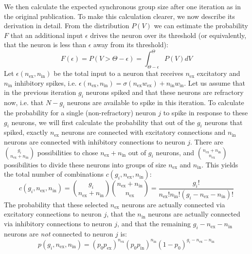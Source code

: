 \documentclass[10pt,a4paper,onecolumn]{article}
\begin{document}
We then calculate the expected synchronous group size after one iteration as in the original publication. To make this calculation clearer, we now describe its derivation in detail. From the distribution $P(V)$ we can estimate the probability $F$ that an additional input $\epsilon$ drives the neuron over its threshold (or equivalently, that the neuron is less than $\epsilon$ away from its threshold):
\begin{equation}
F(\epsilon) = P(V>\Theta-\epsilon) = \int_{\Theta-\epsilon}^{\Theta}P(V)dV
\end{equation}
Let $\epsilon(n_\text{ex}, n_\text{in})$ be the total input to a neuron that receives $n_\text{ex}$ excitatory and $n_\text{in}$ inhibitory spikes, i.e. $\epsilon(n_\text{ex}, n_\text{in}) = \sigma(n_\text{ex}w_\text{ex}) + n_\text{in}w_\text{in}$. Let us assume that in the previous iteration $g_i$ neurons spiked and that these neurons are refractory now, i.e. that $N-g_i$ neurons are available to spike in this iteration. To calculate the probability for a single (non-refractory) neuron $j$ to spike in response to these $g_i$ neurons, we will first calculate the probability that out of the $g_i$ neurons that spiked, exactly $n_\text{ex}$ neurons are connected with excitatory connections and $n_\text{in}$ neurons are connected with inhibitory connections to neuron $j$. There are $\binom{g_i}{n_\text{ex} + n_\text{in}}$ possibilities to chose $n_\text{ex} + n_\text{in}$ out of $g_i$ neurons, and $\binom{n_\text{ex} + n_\text{in}}{n_\text{ex}}$ possibilities to divide these neurons into groups of size $n_\text{ex}$ and $n_\text{in}$. This yields the total number of combinations $c(g_i, n_\text{ex}, n_\text{in})$:
\begin{equation}
c(g_i, n_\text{ex}, n_\text{in}) = \binom{g_i}{n_\text{ex} + n_\text{in}}\binom{n_\text{ex} + n_\text{in}}{n_\text{ex}} = \frac{g_i!}{n_\text{ex}!n_\text{in}!(g_i - n_\text{ex} - n_\text{in})!}
\end{equation}
The probability that these selected $n_\text{ex}$ neurons are actually connected via excitatory connections to neuron $j$, that the $n_\text{in}$ neurons are actually connected via inhibitory connections to neuron $j$, and that the remaining $g_i - n_\text{ex} - n_\text{in}$ neurons are \emph{not} connected to neuron $j$ is:
\begin{equation}
p(g_i, n_\text{ex}, n_\text{in}) = (p_0 p_\text{ex})^{n_\text{ex}} (p_0 p_\text{in})^{n_\text{in}} (1 - p_0)^{g_i - n_\text{ex} - n_\text{in}}
\end{equation}
\end{document}

